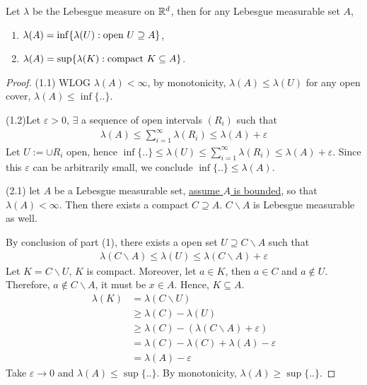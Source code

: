 \documentclass[11pt]{article}
\begin{document}
	\begin{theorem}
		Let $\lambda$ be the Lebesgue measure on $\mathbb{R}^d$, then for any Lebesgue measurable set $A$,
		\begin{enumerate}
			\item $\lambda(A) = \inf \{\lambda(U) : \text{{open }} U \supseteq A\}$,
			\item $\lambda(A) = \sup \{\lambda(K) : \text{{compact }} K \subseteq A\}$.
		\end{enumerate}
		\begin{proof}
			(1.1) WLOG $\lambda(A) < \infty$, by monotonicity, $\lambda(A) \leq \lambda(U)$ for any open cover, $\lambda(A) \leq \inf \{..\}$.
			
			(1.2)Let $\varepsilon > 0$, $\exists$ a sequence of open intervals $(R_i)$ such that 
			\begin{align}
				\lambda(A) \leq \sum^\infty_{i=1} \lambda(R_i) \leq \lambda(A) + \varepsilon
			\end{align}
			Let $U := \cup R_i$ open, hence $\inf \{..\} \leq \lambda(U) \leq \sum^\infty_{i=1} \lambda(R_i) \leq \lambda(A) + \varepsilon$. Since this $\varepsilon$ can be arbitrarily small, we conclude $\inf\{..\} \leq \lambda(A)$.
			
			(2.1) let $A$ be a Lebesgue measurable set, \ul{assume $A$ is bounded}, so that $\lambda(A) < \infty$. Then there exists a compact $C \supseteq A$. $C \backslash A$ is Lebesgue measurable as well.
			
			By conclusion of part (1), there exists a open set $U \supseteq C \backslash A$ such that 
			\begin{align}
				\lambda(C \backslash A) \leq \lambda(U) \leq \lambda(C \backslash A) + \varepsilon
			\end{align}
			Let $K = C \backslash U$, $K$ is compact. Moreover, let $a \in K$, then $a \in C$ and $a \notin U$. Therefore, $a \notin C \backslash A$, it must be $x \in A$. Hence, $K \subseteq A$.
			\begin{align}
				\lambda(K) &= \lambda(C \backslash U) \\
				&\geq \lambda(C) - \lambda(U) \\
				&\geq \lambda(C) - (\lambda(C \backslash A) + \varepsilon) \\
				&=\lambda(C) - \lambda(C) + \lambda(A) - \varepsilon \\
				&=\lambda(A) - \varepsilon
			\end{align}
			Take $\varepsilon \to 0$ and $\lambda(A) \leq \sup \{..\}$. By monotonicity, $\lambda(A) \geq \sup \{..\}$.
			

\end{proof}
\end{theorem}
\end{document}
